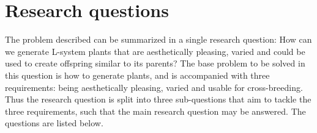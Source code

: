 

\section{Research questions}
The problem described can be summarized in a single research question: How can we generate \gls{L-system} plants that are aesthetically pleasing, varied and could be used to create offspring similar to its parents?
The base problem to be solved in this question is how to generate plants, and is accompanied with three requirements: being aesthetically pleasing, varied and usable for cross-breeding.
Thus the research question is split into three sub-questions that aim to tackle the three requirements, such that the main research question may be answered.
The questions are listed below.



